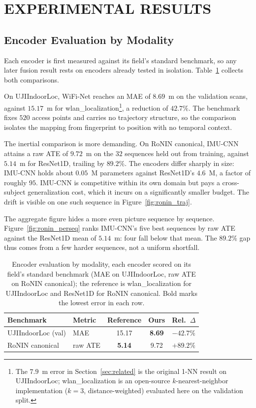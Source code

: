 \section{\uppercase{Experimental results}}\label{sec:results}

\subsection{Encoder Evaluation by Modality}

\noindent
Each encoder is first measured against its field's standard benchmark, so any
later fusion result rests on encoders already tested in isolation.
Table~\ref{tab:perleg} collects both comparisons.

On UJIIndoorLoc, WiFi-Net reaches an MAE of $8.69$~m on the validation scans,
against $15.17$~m for wlan\_localization\footnote{The $7.9$~m error in Section~\ref{sec:related} is the original 1-NN result on UJIIndoorLoc; wlan\_localization is an open-source $k$-nearest-neighbor implementation ($k=3$, distance-weighted) evaluated here on the validation split.}, a reduction of $42.7\%$. The benchmark
fixes $520$ access points and carries no trajectory structure, so the comparison
isolates the mapping from fingerprint to position with no temporal context.

The inertial comparison is more demanding. On RoNIN canonical, IMU-CNN attains a
raw ATE of $9.72$~m on the $32$ sequences held out from training, against
$5.14$~m for ResNet1D, trailing by $89.2\%$. The encoders differ sharply in size:
IMU-CNN holds about $0.05$~M parameters against ResNet1D's $4.6$~M, a factor of
roughly $95$. IMU-CNN is competitive within its own domain but pays a cross-subject
generalization cost, which it incurs on a significantly smaller budget. The drift is visible
on one such sequence in Figure~\ref{fig:ronin_traj}.

The aggregate figure hides a more even picture sequence by sequence.
Figure~\ref{fig:ronin_perseq} ranks IMU-CNN's five best sequences by raw
ATE against the ResNet1D mean of $5.14$~m: four fall below that mean. The $89.2\%$
gap thus comes from a few harder sequences, not a uniform shortfall.

\begin{table}[tb]
\caption{Encoder evaluation by modality, each encoder scored on its field's
  standard benchmark (MAE on UJIIndoorLoc, raw ATE on RoNIN canonical); the
  reference is wlan\_localization for UJIIndoorLoc and ResNet1D for RoNIN
  canonical. Bold marks the lowest error in each row.}\label{tab:perleg}
\centering
\footnotesize
\setlength{\tabcolsep}{2pt}
\begin{tabular}{|l|l|c|c|c|}\hline
Benchmark & Metric & Reference & Ours & Rel.\ $\Delta$ \\ \hline
UJIIndoorLoc (val) & MAE & 15.17 & \textbf{8.69} & $-42.7\%$ \\ \hline
RoNIN canonical & raw ATE & \textbf{5.14} & 9.72 & $+89.2\%$ \\ \hline
\end{tabular}
\end{table}

